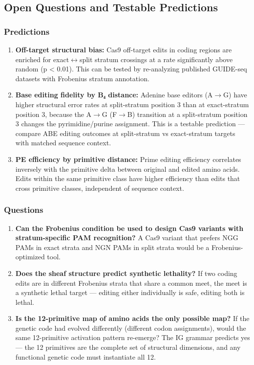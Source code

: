 \documentclass[12pt,a4paper]{article}
\begin{document}
\subsection{Open Questions and Testable Predictions}

\subsubsection{Predictions}

\begin{enumerate}
    \item \textbf{Off-target structural bias:} Cas9 off-target edits in coding regions are enriched for exact$\leftrightarrow$split stratum crossings at a rate significantly above random (p \textless{} 0.01). This can be tested by re-analyzing published GUIDE-seq datasets with Frobenius stratum annotation.
    \item \textbf{Base editing fidelity by B₄ distance:} Adenine base editors (A$\rightarrow$G) have higher structural error rates at split-stratum position 3 than at exact-stratum position 3, because the A$\rightarrow$G (F$\rightarrow$B) transition at a split-stratum position 3 changes the pyrimidine/purine assignment. This is a testable prediction --- compare ABE editing outcomes at split-stratum vs exact-stratum targets with matched sequence context.
    \item \textbf{PE efficiency by primitive distance:} Prime editing efficiency correlates inversely with the primitive delta between original and edited amino acids. Edits within the same primitive class have higher efficiency than edits that cross primitive classes, independent of sequence context.
\end{enumerate}

\subsubsection{Questions}

\begin{enumerate}
    \item \textbf{Can the Frobenius condition be used to design Cas9 variants with stratum-specific PAM recognition?} A Cas9 variant that prefers NGG PAMs in exact strata and NGN PAMs in split strata would be a Frobenius-optimized tool.
    \item \textbf{Does the sheaf structure predict synthetic lethality?} If two coding edits are in different Frobenius strata that share a common meet, the meet is a synthetic lethal target --- editing either individually is safe, editing both is lethal.
    \item \textbf{Is the 12-primitive map of amino acids the only possible map?} If the genetic code had evolved differently (different codon assignments), would the same 12-primitive activation pattern re-emerge? The IG grammar predicts yes --- the 12 primitives are the complete set of structural dimensions, and any functional genetic code must instantiate all 12.
\end{enumerate}
\end{document}
